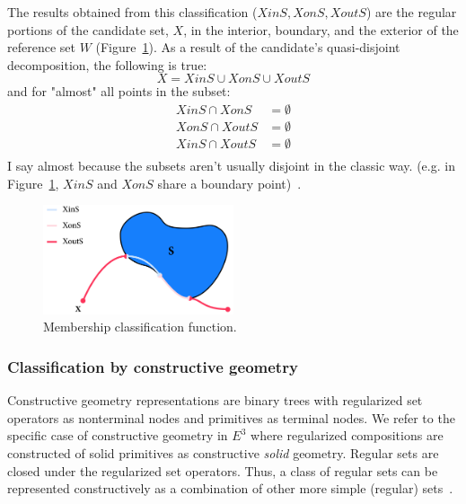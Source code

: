 \documentclass[a4paper,11pt,oneside]{article}
\begin{document}
The results obtained from this classification ($XinS, XonS, XoutS$) are the regular portions of the candidate set, $X$, in the interior, boundary, and the exterior of the reference set $W$ (Figure~\ref{sec3.2:membership_classification}). As a result of the candidate's quasi-disjoint decomposition, the following is true:
\begin{equation}
	X = XinS \cup XonS \cup XoutS
\end{equation}
and for "almost" all points in the subset:
\begin{align*}
	XinS \cap XonS  & = \emptyset \\
	XonS \cap XoutS & = \emptyset \\
	XinS \cap XoutS & = \emptyset \\
\end{align*}
I say almost because the subsets aren't usually disjoint in the classic way. (e.g. in Figure~\ref{sec3.2:membership_classification}, $XinS$ and $XonS$ share a boundary point)~\cite{mansfield_1987}.



\begin{figure}[ht]
	\begin{center}
		\includegraphics[width=0.5\textwidth]{section3/3.2/membership-classification.png}
	\end{center}
	\caption{Membership classification function.}
	\label{sec3.2:membership_classification}
\end{figure}

\subsubsection{Classification by constructive geometry}

Constructive geometry representations are binary trees with regularized set operators as nonterminal nodes and primitives as terminal nodes. We refer to the specific case of constructive geometry in $E^3$ where regularized compositions are constructed of solid primitives as constructive \textit{solid} geometry. Regular sets are closed under the regularized set operators. Thus, a class of regular sets can be represented constructively as a combination of other more simple (regular) sets~\cite{tilove1977a}.
\end{document}
